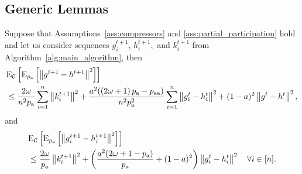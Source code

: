 \documentclass{article}
\newcommand*{\probavailable}{\ensuremath{p_{\textnormal{a}}}}
\newcommand*{\probpairaa}{\ensuremath{p_{\textnormal{aa}}}}
\begin{document}
\subsection{Generic Lemmas}
\begin{lemma}
  Suppose that Assumptions~\ref{ass:compressors} and \ref{ass:partial_participation} hold and let us consider sequences $g^{t+1}_i$, $h^{t+1}_i,$ and $k^{t+1}_i$ from Algorithm~\ref{alg:main_algorithm}, then
  \begin{align}
      \label{eq:compressor_global_error}
      &\ExpSub{\cC}{\ExpSub{\probavailable}{\norm{g^{t+1} - h^{t+1}}^2}} \nonumber \\
      &\leq \frac{2 \omega}{n^2 \probavailable}\sum_{i=1}^n\norm{k^{t+1}_i}^2 +\frac{a^2 (\left(2 \omega + 1\right)\probavailable - \probpairaa)}{n^2 \probavailable^2}\sum_{i=1}^n\norm{g^{t}_i - h^{t}_i}^2 + (1 - a)^2\norm{g^{t} - h^{t}}^2,
  \end{align}
  and
  \begin{align}
      \label{eq:compressor_local_error}
      &\ExpSub{\cC}{\ExpSub{\probavailable}{\norm{g^{t+1}_i - h^{t+1}_i}^2}} \nonumber \\
      &\leq \frac{2 \omega}{\probavailable}\norm{k^{t+1}_i}^2 + \left(\frac{a^2(2\omega + 1 - \probavailable)}{\probavailable} + (1 - a)^2\right)\norm{g^{t}_i - h^{t}_i}^2\quad \forall i \in [n].
  \end{align}
\end{lemma}
\end{document}
